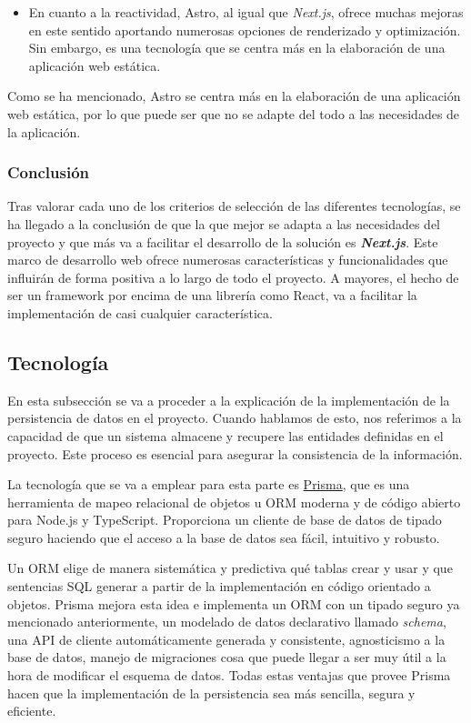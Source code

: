 \begin{itemize}
    \item[\regular] En cuanto a la reactividad, Astro, al igual que \textit{Next.js}, ofrece muchas mejoras en este sentido aportando numerosas opciones de renderizado y optimización. Sin embargo, es una tecnología que se centra más en la elaboración de una aplicación web estática.
\end{itemize}

Como se ha mencionado, Astro se centra más en la elaboración de una aplicación web estática, por lo que puede ser que no se adapte del todo a las necesidades de la aplicación.

\subsubsection{Conclusión}

Tras valorar cada uno de los criterios de selección de las diferentes tecnologías, se ha llegado a la conclusión de que la que mejor se adapta a las necesidades del proyecto y que más va a facilitar el desarrollo de la solución es \textbf{\textit{Next.js}}. Este marco de desarrollo web ofrece numerosas características y funcionalidades que influirán de forma positiva a lo largo de todo el proyecto. A mayores, el hecho de ser un framework por encima de una librería como React, va a facilitar la implementación de casi cualquier característica.

\subsection{Tecnología}

En esta subsección se va a proceder a la explicación de la implementación de la persistencia de datos en el proyecto. Cuando hablamos de esto, nos referimos a la capacidad de que un sistema almacene y recupere las entidades definidas en el proyecto. Este proceso es esencial para asegurar la consistencia de la información.

La tecnología que se va a emplear para esta parte es \href{https://www.prisma.io/}{Prisma}, que es una herramienta de mapeo relacional de objetos u ORM moderna y de código abierto para Node.js y TypeScript. Proporciona un cliente de base de datos de tipado seguro haciendo que el acceso a la base de datos sea fácil, intuitivo y robusto.

Un ORM elige de manera sistemática y predictiva qué tablas crear y usar y que sentencias SQL generar a partir de la implementación en código orientado a objetos. Prisma mejora esta idea e implementa un ORM con un tipado seguro ya mencionado anteriormente, un modelado de datos declarativo llamado \textit{schema}, una API de cliente automáticamente generada y consistente, agnosticismo a la base de datos, manejo de migraciones cosa que puede llegar a ser muy útil a la hora de modificar el esquema de datos. Todas estas ventajas que provee Prisma hacen que la implementación de la persistencia sea más sencilla, segura y eficiente.

